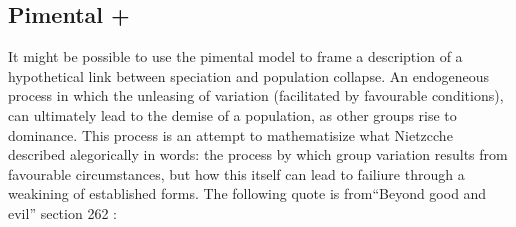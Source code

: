 \subsection{Pimental +}


\noindent
It might be possible to use the pimental model to frame a description of a hypothetical link between speciation and population collapse. An endogeneous process in which the unleasing of variation (facilitated by favourable conditions), can ultimately lead to the demise of a population, as other groups rise to dominance. This process is an attempt to mathematisize what Nietzcche described alegorically in words: the process by which group variation results from favourable circumstances, but how this itself can lead to failiure through a weakining of established forms. The following quote is from``Beyond good and evil'' section 262 \cite{nietzsche2013beyond}:


